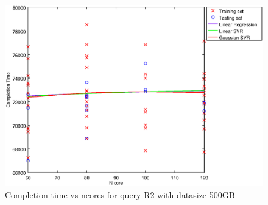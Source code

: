
\begin {figure}[hbtp]
\centering
\includegraphics[width=\textwidth]{output/R2_500_1_OVER_NCORES/plot_R2_500_bestmodels.eps}
\caption{Completion time vs ncores for query R2 with datasize 500GB}
\label{fig:all_nonlinear_R2_500}
\end {figure}
